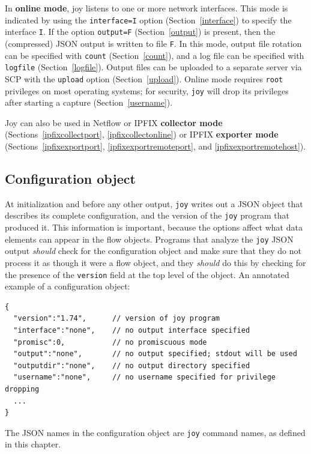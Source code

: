 \documentclass{book}
\begin{document}
In \textbf{online mode}, joy listens to one or more network
interfaces.  This mode is indicated by using the \texttt{interface=I}
option (Section~\ref{interface}) to specify the interface \texttt{I}.
If the option \texttt{output=F} (Section~\ref{output}) is present,
then the (compressed) JSON output is written to file \texttt{F}.  In
this mode, output file rotation can be specified with \texttt{count}
(Section~\ref{count}), and a log file can be specified with
\texttt{logfile} (Section~\ref{logfile}).  Output files can be
uploaded to a separate server via SCP with the \texttt{upload} option
(Section~\ref{upload}).  Online mode requires \texttt{root} privileges
on most operating systems; for security, \texttt{joy} will drop its
privileges after starting a capture (Section~\ref{username}).

Joy can also be used in Netflow or IPFIX \textbf{collector mode}
(Sections~\ref{ipfixcollectport}, \ref{ipfixcollectonline}) or IPFIX
\textbf{exporter mode} (Sections~\ref{ipfixexportport},
\ref{ipfixexportremoteport}, and \ref{ipfixexportremotehost}).

\subsection{Configuration object}
At initialization and before any other output, \texttt{joy} writes out
a JSON object that describes its complete configuration, and the
version of the \texttt{joy} program that produced it.  This
information is important, because the options affect what data
elements can appear in the flow objects.  Programs that analyze the
\texttt{joy} JSON output \textit{should} check for the configuration
object and make sure that they do not process it as though it were a
flow object, and they \textit{should} do this by checking
for the presence of the \texttt{version} field at the top level
of the object.  An annotated example of a configuration object:
\begin{mdframed}[style=cli]
\begin{verbatim}
{
  "version":"1.74",      // version of joy program 
  "interface":"none",    // no output interface specified
  "promisc":0,           // no promiscuous mode
  "output":"none",       // no output specified; stdout will be used
  "outputdir":"none",    // no output directory specified
  "username":"none",     // no username specified for privilege dropping
  ...
}
\end{verbatim}
\end{mdframed}
The JSON names in the configuration object are \texttt{joy} command
names, as defined in this chapter.  
\end{document}
